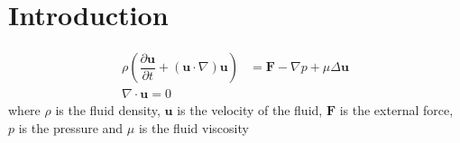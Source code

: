 \section{Introduction}

\begin{equation}
\label{eq:NavierStokes}
\begin{aligned}
    \rho \left(\dfrac{\partial \mathbf{u}}{\partial t}+(\mathbf{u} \cdot \nabla) \mathbf{u}\right) &= \mathbf{F}-\nabla p+\mu  \Delta \mathbf{u}\\
    \nabla\cdot\mathbf{u} = 0
\end{aligned}
\end{equation}
where $\rho$ is the fluid density, $\mathbf{u}$ is the velocity of the fluid, $\mathbf{F}$ is the external force, $p$ is the pressure and $\mu$ is the fluid viscosity